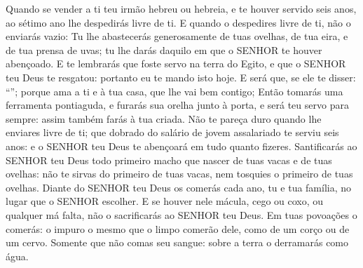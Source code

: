 {{  Quando se vender a ti teu irmão hebreu ou hebreia, e te houver servido seis anos, ao sétimo ano lhe despedirás livre de ti.
  E quando o despedires livre de ti, não o enviarás vazio:
  Tu lhe abastecerás generosamente de tuas ovelhas, de tua eira, e de tua prensa de uvas; tu lhe darás daquilo em que o SENHOR te houver abençoado.
  E te lembrarás que foste servo na terra do Egito, e que o SENHOR teu Deus te resgatou: portanto eu te mando isto hoje.
  E será que, se ele te disser: \enquote{}; porque ama a ti e à tua casa, que lhe vai bem contigo;
  Então tomarás uma ferramenta pontiaguda, e furarás sua orelha junto à porta, e será teu servo para sempre: assim também farás à tua criada.
  Não te pareça duro quando lhe enviares livre de ti; que dobrado do salário de jovem assalariado te serviu seis anos: e o SENHOR teu Deus te abençoará em tudo quanto fizeres.
  Santificarás ao SENHOR teu Deus todo primeiro macho que nascer de tuas vacas e de tuas ovelhas: não te sirvas do primeiro de tuas vacas, nem tosquies o primeiro de tuas ovelhas.
  Diante do SENHOR teu Deus os comerás cada ano, tu e tua família, no lugar que o SENHOR escolher.
  E se houver nele mácula, cego ou coxo, ou qualquer má falta, não o sacrificarás ao SENHOR teu Deus.
  Em tuas povoações o comerás: o impuro o mesmo que o limpo comerão dele, como de um corço ou de um cervo.
  Somente que não comas seu sangue: sobre a terra o derramarás como água}. %
\par }

